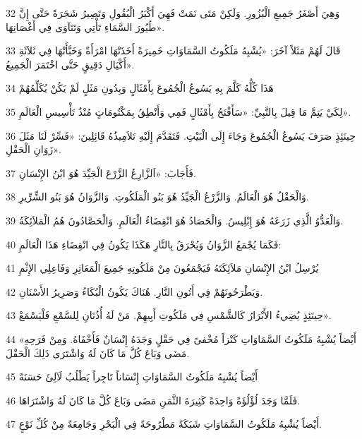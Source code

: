 \par 32 وَهِيَ أَصْغَرُ جَمِيعِ الْبُزُورِ. وَلَكِنْ مَتَى نَمَتْ فَهِيَ أَكْبَرُ الْبُقُولِ وَتَصِيرُ شَجَرَةً حَتَّى إِنَّ طُيُورَ السَّمَاءِ تَأْتِي وَتَتَآوَى فِي أَغْصَانِهَا».
\par 33 قَالَ لَهُمْ مَثَلاً آخَرَ: «يُشْبِهُ مَلَكُوتُ السَّمَاوَاتِ خَمِيرَةً أَخَذَتْهَا امْرَأَةٌ وَخَبَّأَتْهَا فِي ثَلاَثَةِ أَكْيَالِ دَقِيقٍ حَتَّى اخْتَمَرَ الْجَمِيعُ».
\par 34 هَذَا كُلُّهُ كَلَّمَ بِهِ يَسُوعُ الْجُمُوعَ بِأَمْثَالٍ وَبِدُونِ مَثَلٍ لَمْ يَكُنْ يُكَلِّمُهُمْ
\par 35 لِكَيْ يَتِمَّ مَا قِيلَ بِالنَّبِيِّ: «سَأَفْتَحُ بِأَمْثَالٍ فَمِي وَأَنْطِقُ بِمَكْتُومَاتٍ مُنْذُ تَأْسِيسِ الْعَالَمِ».
\par 36 حِينَئِذٍ صَرَفَ يَسُوعُ الْجُمُوعَ وَجَاءَ إِلَى الْبَيْتِ. فَتَقَدَّمَ إِلَيْهِ تَلاَمِيذُهُ قَائِلِينَ: «فَسِّرْ لَنَا مَثَلَ زَوَانِ الْحَقْلِ».
\par 37 فَأَجَابَ: «اَلزَّارِعُ الزَّرْعَ الْجَيِّدَ هُوَ ابْنُ الإِنْسَانِ.
\par 38 وَالْحَقْلُ هُوَ الْعَالَمُ. وَالزَّرْعُ الْجَيِّدُ هُوَ بَنُو الْمَلَكُوتِ. وَالزَّوَانُ هُوَ بَنُو الشِّرِّيرِ.
\par 39 وَالْعَدُّوُ الَّذِي زَرَعَهُ هُوَ إِبْلِيسُ. وَالْحَصَادُ هُوَ انْقِضَاءُ الْعَالَمِ. وَالْحَصَّادُونَ هُمُ الْمَلاَئِكَةُ.
\par 40 فَكَمَا يُجْمَعُ الزَّوَانُ وَيُحْرَقُ بِالنَّارِ هَكَذَا يَكُونُ فِي انْقِضَاءِ هَذَا الْعَالَمِ:
\par 41 يُرْسِلُ ابْنُ الإِنْسَانِ مَلاَئِكَتَهُ فَيَجْمَعُونَ مِنْ مَلَكُوتِهِ جَمِيعَ الْمَعَاثِرِ وَفَاعِلِي الإِثْمِ
\par 42 وَيَطْرَحُونَهُمْ فِي أَتُونِ النَّارِ. هُنَاكَ يَكُونُ الْبُكَاءُ وَصَرِيرُ الأَسْنَانِ.
\par 43 حِينَئِذٍ يُضِيءُ الأَبْرَارُ كَالشَّمْسِ فِي مَلَكُوتِ أَبِيهِمْ. مَنْ لَهُ أُذُنَانِ لِلسَّمْعِ فَلْيَسْمَعْ».
\par 44 «أَيْضاً يُشْبِهُ مَلَكُوتُ السَّمَاوَاتِ كَنْزاً مُخْفىً فِي حَقْلٍ وَجَدَهُ إِنْسَانٌ فَأَخْفَاهُ. وَمِنْ فَرَحِهِ مَضَى وَبَاعَ كُلَّ مَا كَانَ لَهُ وَاشْتَرَى ذَلِكَ الْحَقْلَ.
\par 45 أَيْضاً يُشْبِهُ مَلَكُوتُ السَّمَاوَاتِ إِنْسَاناً تَاجِراً يَطْلُبُ لَآلِئَ حَسَنَةً
\par 46 فَلَمَّا وَجَدَ لُؤْلُؤَةً وَاحِدَةً كَثِيرَةَ الثَّمَنِ مَضَى وَبَاعَ كُلَّ مَا كَانَ لَهُ وَاشْتَرَاهَا.
\par 47 أَيْضاً يُشْبِهُ مَلَكُوتُ السَّمَاوَاتِ شَبَكَةً مَطْرُوحَةً فِي الْبَحْرِ وَجَامِعَةً مِنْ كُلِّ نَوْعٍ.

